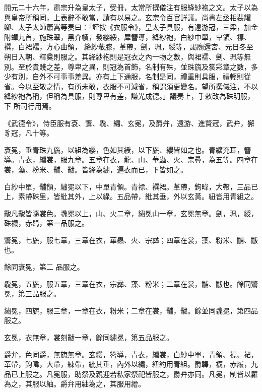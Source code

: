 \begin{pinyinscope}
 開元二十六年，肅宗升為皇太子，受冊，太常所撰儀注有服絳紗袍之文。太子以為與皇帝所稱同，上表辭不敢當，請有以易之。玄宗令百官詳議。尚書左丞相裴耀卿、太子太師蕭嵩等奏曰：「謹按《衣服令》，皇太子具服，有遠游冠，三梁，加金附蟬九首，施珠翠，黑介幘，發纓綏，犀簪導，絳紗袍，白紗中單，皁領、褾、襈，白裙襦，方心曲領，
 絳紗蔽膝，革帶，劍，珮，綬等，謁廟還宮、元日冬至朔日入朝、釋奠則服之。其絳紗袍則是冠衣之內一物之數，與裙襦、劍、珮等無別。至於貴賤之差，尊卑之異，則冠為首飾，名制有殊，並珠旒及裳彩章之數，多少有別，自外不可事事差異。亦有上下通服，名制是同，禮重則具服，禮輕則從省。今以至敬之情，有所未敢，衣服不可減省，稱謂須更變名。望所撰儀注，不以絳紗袍為稱，但稱為具服，則尊卑有差，謙光成德。」議奏上，手敕改為硃明服，下
 所司行用焉。



 《武德令》，侍臣服有袞、鷩、毳、繡、玄冕，及爵弁，遠游、進賢冠，武弁，獬豸冠，凡十等。



 袞冕，垂青珠九旒，以組為纓，色如其綬，以下旒、纓皆如之也。青纊充耳，簪導。青衣，纁裳，服九章。五章在衣，龍、山、華蟲、火、宗彞，為五等。四章在裳，藻、粉米、黼、黻。皆絳為繡，遍衣而已，下皆如之。



 白紗中單，黼領，繡冕以下，中單青領。青褾、襈裙。革帶，鉤暐，大帶，三品已上，素帶硃里，皆紕其外，上以綠。五品帶，紕其垂，外以玄黃。紐皆用青組之。



 黻凡黻皆隨裳色。毳冕以上，山、火二章，繡冕山一章，玄冕無章。劍，珮，綬，硃襪，赤舄，第一品服之。



 鷩冕，七旒，服七章，三章在衣，華蟲、火、宗彞；四章在裳，藻、粉米、黼、黻也。



 餘同袞冕，第二
 品服之。



 毳冕，五旒，服五章，三章在衣，宗彞、藻、粉米；二章在裳，黼、黻也。餘同鷩冕，第三品服之。



 繡冕，四旒，服三章，一章在衣，粉米；二章在裳，黼，黻。餘並同毳冕，第四品服之。



 玄冕，衣無章，裳刻黻一章，餘同繡冕，第五品服之。



 爵弁，色同爵，無旒無章。玄纓，簪導，青衣，纁裳，白紗中單，青領、褾、裙，革帶，鉤暐，大帶，練帶，紕其垂，內外以繡，紐約用青組。爵韠，襪，赤履，九品已上服之。凡冕服，助祭及親迎若私家祭祀皆服之，爵弁亦同。凡冕，制皆以羅為之，其服以紬。爵弁用紬為之，其服用繒。




\end{pinyinscope}
